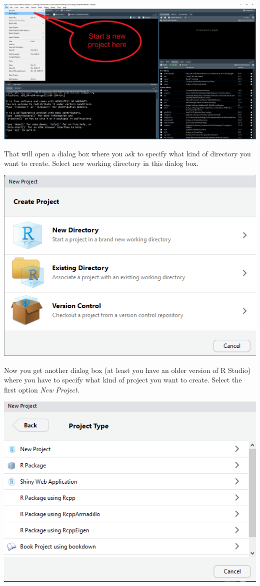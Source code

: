 \documentclass[]{book}
\theoremstyle{definition}
\theoremstyle{definition}
\theoremstyle{definition}
\theoremstyle{remark}
\begin{document}
\includegraphics{imgs/newproject.png}

That will open a dialog box where you ask to specify what kind of
directory you want to create. Select new working directory in this
dialog box.

\includegraphics{imgs/newproject2.PNG}

Now you get another dialog box (at least you have an older version of R
Studio) where you have to specify what kind of project you want to
create. Select the first option \emph{New Project}.

\includegraphics{imgs/newproject3.PNG}
\end{document}
